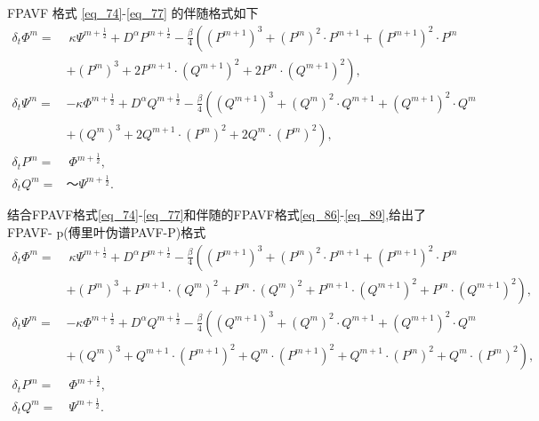  FPAVF 格式 \eqref{eq_74}-\eqref{eq_77} 的伴随格式如下
\begin{align}
\delta_{t} \varPhi^{m}=&~\kappa \Psi^{m+\frac{1}{2}}+D^{\alpha} P^{m+\frac{1}{2}}-\frac{\beta}{4}\left( (P^{m+1})^3+ (P^{m})^{2}\cdot P^{m+1}+(P^{m+1})^{2}\cdot P^{m}\right.\nonumber\\
	&\left.+ (P^{m})^{3}+2 P^{m+1}\cdot (Q^{m+1})^{2}+2 P^{m}\cdot (Q^{m+1})^{2}\right),\label{eq_86}\\
\delta_{t} \Psi^{m}=&-\kappa \varPhi^{m+\frac{1}{2}}+D^{\alpha} Q^{m+\frac{1}{2}}-\frac{\beta}{4}\left( (Q^{m+1})^3+ (Q^{m})^{2}\cdot Q^{m+1}+ (Q^{m+1})^{2}\cdot Q^{m}\right.\nonumber\\
	&\left.+ (Q^{m})^{3}+2 Q^{m+1}\cdot (P^{m})^{2}+2 Q^{m}\cdot (P^{m})^{2}\right),\label{eq_87}\\
\delta_{t} P^{m}=&~\varPhi^{m+\frac{1}{2}},\label{eq_88}\\
\delta_{t} Q^{m}=&～\Psi^{m+\frac{1}{2}}.\label{eq_89}
\end{align}

结合FPAVF格式\eqref{eq_74}-\eqref{eq_77}和伴随的FPAVF格式\eqref{eq_86}-\eqref{eq_89},给出了FPAVF- p(傅里叶伪谱PAVF-P)格式
\begin{align}
\delta_{t} \varPhi^{m}=&~\kappa \Psi^{m+\frac{1}{2}}+D^{\alpha} P^{m+\frac{1}{2}}-\frac{\beta}{4}\left((P^{m+1})^3+(P^{m})^{2}\cdot P^{m+1}+(P^{m+1})^{2}\cdot P^{m}\right.\nonumber\\
	&\left.+(P^{m})^{3}+P^{m+1}\cdot (Q^{m})^{2}+P^{m}\cdot (Q^{m})^{2}+P^{m+1}\cdot (Q^{m+1})^{2}+P^{m}\cdot (Q^{m+1})^{2}\right),\label{eq_98}\\
\delta_{t} \Psi^{m}=&-\kappa \varPhi^{m+\frac{1}{2}}+D^{\alpha} Q^{m+\frac{1}{2}}-\frac{\beta}{4}\left((Q^{m+1})^3+(Q^{m})^{2}\cdot Q^{m+1}+(Q^{m+1})^{2}\cdot Q^{m}\right.\nonumber\\
	&\left.+(Q^{m})^{3}+Q^{m+1}\cdot (P^{m+1})^{2}+Q^{m}\cdot (P^{m+1})^{2}+Q^{m+1}\cdot (P^{m})^{2}+Q^{m}\cdot (P^{m})^{2}\right),\label{eq_99}\\
\delta_{t} P^{m}=&~\varPhi^{m+\frac{1}{2}},\label{eq_100}\\
\delta_{t} Q^{m}=&~\Psi^{m+\frac{1}{2}}.\label{eq_101}
\end{align}



